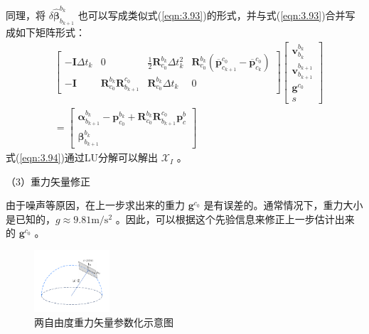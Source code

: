 同理，将 $\delta \hat{\bm{\beta}}_{b_{k+1}}^{b_{k}} $ 也可以写成类似式(\ref{eqn:3.93})的形式，并与式(\ref{eqn:3.93})合并写成如下矩阵形式：
\begin{equation}
\label{eqn:3.94}
\begin{aligned}
& \left[ \begin{array}{cccc}
- \mathbf{I} \Delta t_{k} & 0 & \frac{1}{2} \mathbf{R}_{c_{0}}^{b_{k}} \Delta t_{k}^{2} & \mathbf{R}_{c_{0}}^{b_{k}}(\overline{\mathbf{p}}_{c_{k+1}}^{c_{0}}-\overline{\mathbf{p}}_{c_{k}}^{c_{0}}) \\
{- \mathbf{ I}} & {\mathbf{R}_{c_{0}}^{b_{k}} \mathbf{R}_{b_{k+1}}^{c_{0}}} & {\mathbf{R}_{c_{0}}^{b_{k}} \Delta t_{k}} & {0}
\end{array}\right] 
\left[ \begin{array}{c}
{\mathbf{v}_{b_{k}}^{b_{k}}} \\ {\mathbf{v}_{b_{k+1}}^{b_{k+1}}} \\ {\mathbf{g}^{c_{0}}} \\ s
\end{array}\right] \\
&=\left[ \begin{array}{c}
\bm{\alpha}_{b_{k+1}}^{b_{k}}-\mathbf{p}_{c_{0}}^{b_{k}} + \mathbf{R}^{b_k}_{c_0}\mathbf{R}_{b_{k+1}}^{c_{0}} \mathbf{p}_{c}^{b} \\
{\bm{\beta}_{b_{k+1}}^{b_{k}}}
\end{array}\right]
\end{aligned}
\end{equation}
式(\ref{eqn:3.94})通过LU分解可以解出 $\mathcal{X}_I $ 。

（3）重力矢量修正

由于噪声等原因，在上一步求出来的重力 $\mathbf{g}^{c_0} $ 是有误差的。通常情况下，重力大小是已知的，$g \approx 9.81 \mathrm{m} / \mathrm{s}^{2} $ 。因此，可以根据这个先验信息来修正上一步估计出来的 $\mathbf{g}^{c_0} $ 。
\begin{figure}[h]\setlength{\belowcaptionskip}{-12pt}
	\centering
	\includegraphics[width=0.25\textwidth, angle=-90]{figures/chapter3/fig3_13}
	\caption{两自由度重力矢量参数化示意图}\label{fig3_13}
\end{figure}

